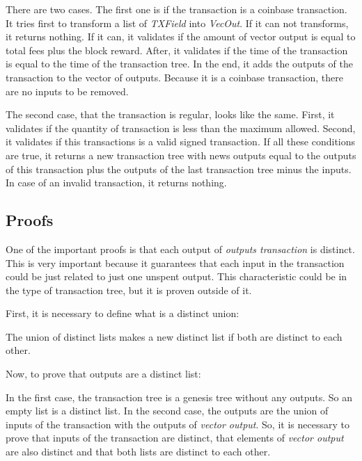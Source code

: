 
There are two cases.
The first one is if the transaction is a coinbase transaction.
It tries first to transform a list of \emph{TXField} into \emph{VecOut}.
If it can not transforms, it returns nothing.
If it can, it validates if the amount of vector output is equal to total fees plus the block reward.
After, it validates if the time of the transaction is equal to the time of the transaction tree.
In the end, it adds the outputs of the transaction to the vector of outputs.
Because it is a coinbase transaction, there are no inputs to be removed.


The second case, that the transaction is regular, looks like the same.
First, it validates if the quantity of transaction is less than the maximum allowed.
Second, it validates if this transactions is a valid signed transaction.
If all these conditions are true, it returns a new transaction tree
with news outputs equal to the outputs of this transaction plus the outputs of the last transaction tree
minus the inputs.
In case of an invalid transaction, it returns nothing.

\subsection{Proofs}

One of the important proofs is that each output of \emph{outputs transaction} is distinct.
This is very important because it guarantees that each input in the transaction could be
just related to just one unspent output.
This characteristic could be in the type of transaction tree,
but it is proven outside of it.

First, it is necessary to define what is a distinct union:


The union of distinct lists makes a new distinct list if both are distinct to each other.

Now, to prove that outputs are a distinct list:


In the first case, the transaction tree is a genesis tree without any outputs.
So an empty list is a distinct list.
In the second case, the outputs are the union of inputs of the transaction with the outputs
of \emph{vector output}.
So, it is necessary to prove that inputs of the transaction are distinct,
that elements of \emph{vector output} are also distinct and that both lists are distinct to each other.

